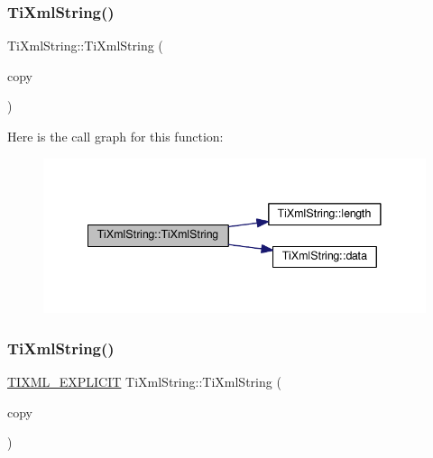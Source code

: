 \mbox{\label{class_ti_xml_string_ac80fe17693a438c9ab2591664743fcb6}} 
\subsubsection{\texorpdfstring{Ti\+Xml\+String()}{TiXmlString()}\hspace{0.1cm}{\footnotesize\ttfamily [2/4]}}
{\footnotesize\ttfamily Ti\+Xml\+String\+::\+Ti\+Xml\+String (\begin{DoxyParamCaption}\item[{const \hyperlink{class_ti_xml_string}{Ti\+Xml\+String} \&}]{copy }\end{DoxyParamCaption})\hspace{0.3cm}{\ttfamily [inline]}}

Here is the call graph for this function\+:\nopagebreak
\begin{figure}[H]
\begin{center}
\leavevmode
\includegraphics[width=341pt]{class_ti_xml_string_ac80fe17693a438c9ab2591664743fcb6_cgraph}
\end{center}
\end{figure}
\mbox{\label{class_ti_xml_string_aa3b32bd2891a757c9f36c21db44c81d2}} 
\subsubsection{\texorpdfstring{Ti\+Xml\+String()}{TiXmlString()}\hspace{0.1cm}{\footnotesize\ttfamily [3/4]}}
{\footnotesize\ttfamily \hyperlink{tinystr_8h_ae341476cd6b94ee32e3e93110a759581}{T\+I\+X\+M\+L\+\_\+\+E\+X\+P\+L\+I\+C\+IT} Ti\+Xml\+String\+::\+Ti\+Xml\+String (\begin{DoxyParamCaption}\item[{const char $\ast$}]{copy }\end{DoxyParamCaption})\hspace{0.3cm}{\ttfamily [inline]}}


